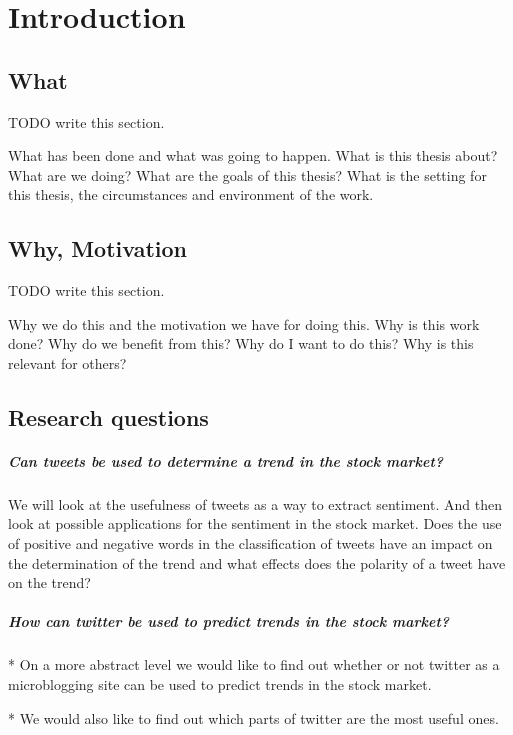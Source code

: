\chapter{Introduction}

\section{What}
TODO write this section.

What has been done and what was going to happen.
What is this thesis about? What are we doing? What are the goals of this
thesis? What is the setting for this thesis, the circumstances and environment
of the work. 

\section{Why, Motivation}
TODO write this section.

Why we do this and the motivation we have for doing this.
Why is this work done? Why do we benefit from this? Why do I want to do this?
Why is this relevant for others? 

\section{Research questions}
	\paragraph{Can tweets be used to determine a trend in the stock market?\\}
	We will look at the usefulness of tweets as a way to extract sentiment. And
then look at possible applications for the sentiment in the stock market. 
Does the use of positive and negative words in the classification of tweets
have an impact on the determination of the trend and what effects does the
polarity of a tweet have on the trend?

	\paragraph{How can twitter be used to predict trends in the stock market?\\}
* On a more abstract level we would like to find out whether or not twitter as a
microblogging site can be used to predict trends in the stock market.

* We would also like to find out which parts of twitter are the most useful
ones. 

